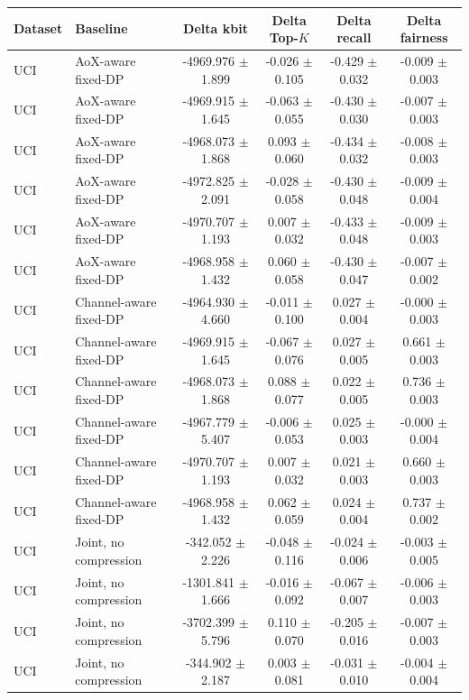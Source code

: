 \begin{tabular}{llcccc}
\toprule
Dataset & Baseline & Delta kbit & Delta Top-$K$ & Delta recall & Delta fairness \\
\midrule
UCI & AoX-aware fixed-DP & -4969.976 $\pm$ 1.899 & -0.026 $\pm$ 0.105 & -0.429 $\pm$ 0.032 & -0.009 $\pm$ 0.003 \\
UCI & AoX-aware fixed-DP & -4969.915 $\pm$ 1.645 & -0.063 $\pm$ 0.055 & -0.430 $\pm$ 0.030 & -0.007 $\pm$ 0.003 \\
UCI & AoX-aware fixed-DP & -4968.073 $\pm$ 1.868 & 0.093 $\pm$ 0.060 & -0.434 $\pm$ 0.032 & -0.008 $\pm$ 0.003 \\
UCI & AoX-aware fixed-DP & -4972.825 $\pm$ 2.091 & -0.028 $\pm$ 0.058 & -0.430 $\pm$ 0.048 & -0.009 $\pm$ 0.004 \\
UCI & AoX-aware fixed-DP & -4970.707 $\pm$ 1.193 & 0.007 $\pm$ 0.032 & -0.433 $\pm$ 0.048 & -0.009 $\pm$ 0.003 \\
UCI & AoX-aware fixed-DP & -4968.958 $\pm$ 1.432 & 0.060 $\pm$ 0.058 & -0.430 $\pm$ 0.047 & -0.007 $\pm$ 0.002 \\
UCI & Channel-aware fixed-DP & -4964.930 $\pm$ 4.660 & -0.011 $\pm$ 0.100 & 0.027 $\pm$ 0.004 & -0.000 $\pm$ 0.003 \\
UCI & Channel-aware fixed-DP & -4969.915 $\pm$ 1.645 & -0.067 $\pm$ 0.076 & 0.027 $\pm$ 0.005 & 0.661 $\pm$ 0.003 \\
UCI & Channel-aware fixed-DP & -4968.073 $\pm$ 1.868 & 0.088 $\pm$ 0.077 & 0.022 $\pm$ 0.005 & 0.736 $\pm$ 0.003 \\
UCI & Channel-aware fixed-DP & -4967.779 $\pm$ 5.407 & -0.006 $\pm$ 0.053 & 0.025 $\pm$ 0.003 & -0.000 $\pm$ 0.004 \\
UCI & Channel-aware fixed-DP & -4970.707 $\pm$ 1.193 & 0.007 $\pm$ 0.032 & 0.021 $\pm$ 0.003 & 0.660 $\pm$ 0.003 \\
UCI & Channel-aware fixed-DP & -4968.958 $\pm$ 1.432 & 0.062 $\pm$ 0.059 & 0.024 $\pm$ 0.004 & 0.737 $\pm$ 0.002 \\
UCI & Joint, no compression & -342.052 $\pm$ 2.226 & -0.048 $\pm$ 0.116 & -0.024 $\pm$ 0.006 & -0.003 $\pm$ 0.005 \\
UCI & Joint, no compression & -1301.841 $\pm$ 1.666 & -0.016 $\pm$ 0.092 & -0.067 $\pm$ 0.007 & -0.006 $\pm$ 0.003 \\
UCI & Joint, no compression & -3702.399 $\pm$ 5.796 & 0.110 $\pm$ 0.070 & -0.205 $\pm$ 0.016 & -0.007 $\pm$ 0.003 \\
UCI & Joint, no compression & -344.902 $\pm$ 2.187 & 0.003 $\pm$ 0.081 & -0.031 $\pm$ 0.010 & -0.004 $\pm$ 0.004 \\

\end{tabular}
